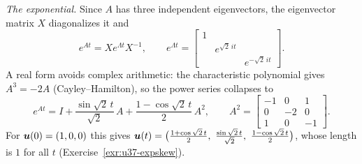 \begin{example}[A skew-symmetric system $d\vb{u}/dt=A\vb{u}$]
\emph{The exponential.} Since $A$ has three independent eigenvectors, the eigenvector matrix $X$ diagonalizes it and
\[
e^{At}=Xe^{\Lambda t}X^{-1},\qquad e^{\Lambda t}=\begin{bmatrix}1&&\\&e^{\sqrt2\,it}&\\&&e^{-\sqrt2\,it}\end{bmatrix}.
\]
A real form avoids complex arithmetic: the characteristic polynomial gives $A^{3}=-2A$ (Cayley--Hamilton), so the power series collapses to
\[
e^{At}=I+\frac{\sin\sqrt2\,t}{\sqrt2}\,A+\frac{1-\cos\sqrt2\,t}{2}\,A^{2},\qquad A^{2}=\begin{bmatrix}-1&0&1\\0&-2&0\\1&0&-1\end{bmatrix}.
\]
For $\boldsymbol{u}(0)=(1,0,0)$ this gives $\vb{u}(t)=\bigl(\tfrac{1+\cos\sqrt2\,t}{2},\ \tfrac{\sin\sqrt2\,t}{\sqrt2},\ \tfrac{1-\cos\sqrt2\,t}{2}\bigr)$, whose length is $1$ for all $t$ (Exercise~\ref{exr:u37-expskew}).
\end{example}

